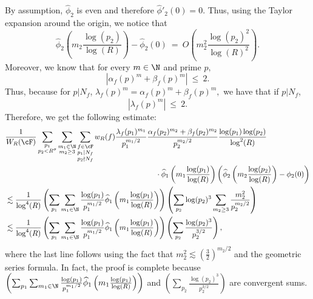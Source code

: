 \documentclass[11pt, reqno]{amsart}
\makeatletter
\renewenvironment{proof}[1][\proofname]{\par
  \vspace{-.7\topsep}%
  \pushQED{\qed}%
  \normalfont
  \topsep0pt \partopsep0pt %
  \trivlist
  \item[\hskip\labelsep
        \itshape
    #1\@addpunct{.}]\ignorespaces
}{%
  \popQED\endtrivlist\@endpefalse
  \addvspace{6pt plus 6pt} %
}
\theoremstyle{definition}
\theoremstyle{remark}
\numberwithin{equation}{section}
\renewcommand{\hat}{\widehat}
\makeatother
\begin{document}
\begin{proof}
By assumption, $\hat\phi_2$ is even and therefore $\hat\phi'_2(0)=0$. Thus, using the Taylor expansion around the origin, we notice that \begin{equation}\label{eq.lemma, case 2:taylor expansion}
    \hat\phi_2 \left(m_2 \frac{\log(p_2)}{\log(R)}\right) - \hat\phi_2(0)\ =\ O\left(m_2^2 \frac{\log(p_2)^2}{\log(R)^2}\right). 
\end{equation}
Moreover, we know that for every $m \in \N$  and prime $p,$ \begin{equation}\label{eq.lemma, case 2: alpha beta bound}
    |\alpha_f(p)^m + \beta_f(p)^m| \ \leq \ 2 .
\end{equation}     
Thus, because for $p|N_f$, $\lambda_f(p)^{m} = \alpha_f(p)^m + \beta_f(p)^m,$ we have that if $p|N_f$,
\begin{equation}
    |\lambda_f(p)^{m}|\ \leq \ 2.
\end{equation}
Therefore, we get the following estimate:
\footnotesize{\begin{align}\label{case2, lemma first eq}
    &\frac{1}{W_R(\cF)}\sum_{\substack{p_1\\ p_2 < R^{\sigma}}}\sum_{\substack{m_1\in \N\\m_2\geq 3}}\sum_{\substack{f\in \cF\\p_1|N_f\\p_2\nmid N_f }}w_R(f)\frac{\lambda_f(p_1)^{m_1}}{p_1^{m_1/2}}\frac{\alpha_f(p_2)^{m_2}+\beta_f(p_2)^{m_2}}{p_2^{m_2/2}} \frac{\log(p_1)\log (p_2)}{\log^2(R)} \notag \\ & \qquad \qquad \qquad \qquad \qquad \qquad \qquad  \qquad \qquad \qquad \cdot \hat\phi_1 \left(m_1 \frac{\log(p_1)}{\log(R)}\right)\left(\hat \phi_2 \left(m_2\frac{\log(p_2)}{\log(R)}\right)- \phi_2 (0)\right) \notag \\
    &\lesssim \frac{1}{\log^4(R)}\left(\sum_{p_1} \sum_{m_1 \in \N}\frac{\log(p_1)}{p_1^{m_1/2}} \hat\phi_1\left(m_1\frac{\log(p_1)}{\log(R)}\right)\right) \left(\sum_{p_2}\log(p_2)^3 \sum_{m_2 \geq 3}\frac{m_2^2}{p_2^{m_2/2}}\right) \\
   &
   \lesssim \frac{1}{\log^4(R)}\left(\sum_{p_1} \sum_{m_1 \in \N}\frac{\log(p_1)}{p_1^{m_1/2}} \hat\phi_1\left(m_1\frac{\log(p_1)}{\log(R)}\right)\right) \left(\sum_{p_2}\frac{\log(p_2)^3 }{p_2^{3/2}}\right),
\end{align}}\normalsize
where the last line follows using the fact that $m_2^2 \lesssim \left(\frac{3}{2}\right)^{m_2/2}$ and the geometric series formula.
In fact, the proof is complete because $\left(\sum_{p_1} \sum_{m_1 \in \N}\frac{\log(p_1)}{p_1^{m_1/2}} \hat\phi_1\left(m_1\frac{\log(p_1)}{\log(R)}\right)\right)$ and $\left(\sum_{p_2}\frac{\log(p_2)^3 }{p_2^{3/2}}\right)$ are convergent sums.
\end{proof}
\end{document}
